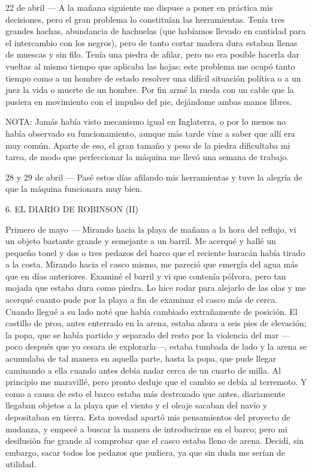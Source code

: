 \documentclass{novela}
\begin{document}
    22 de abril — A la mañana siguiente me dispuse a poner en práctica mis decisiones, pero el gran problema lo constituían las herramientas. Tenía tres grandes hachas, abundancia de hachuelas (que habíamos llevado en cantidad para el intercambio con los negros), pero de tanto cortar madera dura estaban llenas de muescas y sin filo. Tenía una piedra de afilar, pero no era posible hacerla dar vueltas al mismo tiempo que aplicaba las hojas; este problema me ocupó tanto tiempo como a un hombre de estado resolver una difícil situación política o a un juez la vida o muerte de un hombre. Por fin armé la rueda con un cable que la pusiera en movimiento con el impulso del pie, dejándome ambas manos libres.


    NOTA: Jamás había visto mecanismo igual en Inglaterra, o por lo menos no había observado su funcionamiento, aunque más tarde vine a saber que allí era muy común. Aparte de eso, el gran tamaño y peso de la piedra dificultaba mi tarea, de modo que perfeccionar la máquina me llevó una semana de trabajo.


    28 y 29 de abril — Pasé estos días afilando mis herramientas y tuve la alegría de que la máquina funcionara muy bien.





    6. EL DIARIO DE ROBINSON (II)




    Primero de mayo — Mirando hacia la playa de mañana a la hora del reflujo, vi un objeto bastante grande y semejante a un barril. Me acerqué y hallé un pequeño tonel y dos o tres pedazos del barco que el reciente huracán había tirado a la costa. Mirando hacia el casco mismo, me pareció que emergía del agua más que en días anteriores. Examiné el barril y vi que contenía pólvora, pero tan mojada que estaba dura como piedra. Lo hice rodar para alejarlo de las olas y me acerqué cuanto pude por la playa a fin de examinar el casco más de cerca.
    Cuando llegué a su lado noté que había cambiado extrañamente de posición. El castillo de proa, antes enterrado en la arena, estaba ahora a seis pies de elevación; la popa, que se había partido y separado del resto por la violencia del mar —poco después que yo cesara de explorarla—, estaba tumbada de lado y la arena se acumulaba de tal manera en aquella parte, hasta la popa, que pude llegar caminando a ella cuando antes debía nadar cerca de un cuarto de milla. Al principio me maravillé, pero pronto deduje que el cambio se debía al terremoto. Y como a causa de esto el barco estaba más destrozado que antes, diariamente llegaban objetos a la playa que el viento y el oleaje sacaban del navío y depositaban en tierra.
    Esta novedad apartó mis pensamientos del proyecto de mudanza, y empecé a buscar la manera de introducirme en el barco; pero mi desilusión fue grande al comprobar que el casco estaba lleno de arena. Decidí, sin embargo, sacar todos los pedazos que pudiera, ya que sin duda me serían de utilidad.
\end{document}
